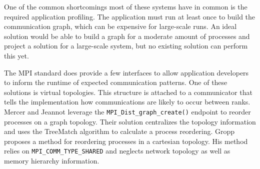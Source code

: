 One of the common shortcomings most of these systems have in common is the required application profiling.
The application must run at least once to build the communication graph, which can be expensive for large-scale runs. 
An ideal solution would be able to build a graph for a moderate amount of processes and project a solution for a large-scale system, but no existing solution can perform this yet. 

The \gls{MPI} standard does provide a few interfaces to allow application developers to inform the runtime of expected communication patterns.  
One of these solutions is virtual topologies. 
This structure is attached to a communicator that tells the implementation how communications are likely to occur between ranks.
Mercer and Jeannot \cite{Mercer2011ImprvMPIWithRR} leverage the \texttt{MPI\_Dist\_graph\_create()} endpoint to reorder processes on a graph topology.
Their solution centralizes the topology information and uses the TreeMatch algorithm \cite{Jeannot2010TreeMatch} to calculate a process reordering.
Gropp \cite{Gropp2019CartTopoMapping} proposes a method for reordering processes in a cartesian topology.
His method relies on \texttt{MPI\_COMM\_TYPE\_SHARED} and neglects network topology as well as memory hierarchy information.

